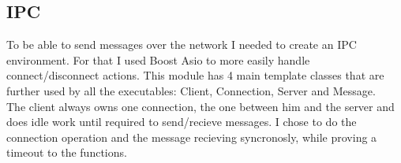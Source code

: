\documentclass[17pt]{article}
\begin{document}
\pagebreak

\subsection{IPC}
\indent \indent
To be able to send messages over the network I needed to create an IPC environment.
For that I used Boost Asio to more easily handle connect/disconnect actions. This module
has 4 main template classes that are further used by all the executables: Client,
Connection, Server and Message.\\

\indent \indent
The client always owns one connection, the one between him and the server and does 
idle work until required to send/recieve messages. I chose to do the connection operation
and the message recieving syncronosly, while proving a timeout to the functions.\\
\end{document}
